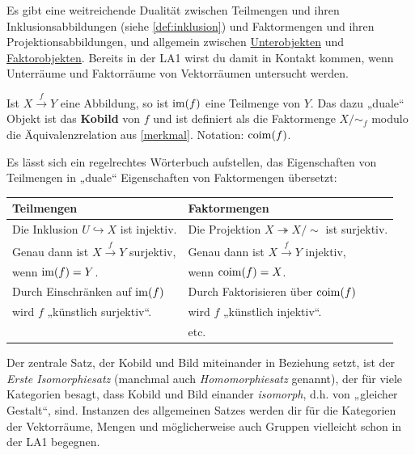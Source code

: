 \begin{vorschau} \label{teilmengenvsfaktormengen} 
    Es gibt eine weitreichende Dualität zwischen Teilmengen und ihren Inklusionsabbildungen (siehe \cref{def:inklusion}) und Faktormengen und ihren Projektionsabbildungen, und allgemein zwischen \href{https://ncatlab.org/nlab/show/subobject}{Unterobjekten} und \href{https://ncatlab.org/nlab/show/quotient+object}{Faktorobjekten}. Bereits in der LA1 wirst du damit in Kontakt kommen, wenn Unterräume und Faktorräume von Vektorräumen untersucht werden.
    
    Ist $X\xrightarrow{f} Y$ eine Abbildung, so ist $\operatorname{im}(f)$ eine Teilmenge von $Y$. Das dazu „duale“ Objekt ist das \textbf{Kobild} von $f$ und ist definiert als die Faktormenge $X/{\sim_f}$ modulo die Äquivalenzrelation aus \cref{merkmal}. Notation: $\operatorname{coim}(f)$.
    
    Es lässt sich ein regelrechtes Wörterbuch aufstellen, das Eigenschaften von Teilmengen in „duale“ Eigenschaften von Faktormengen übersetzt:
    \begin{center}
    \begin{tabular}{ll}
    Teilmengen & Faktormengen \\
    \midrule
    Die Inklusion $U\hookrightarrow X$ ist injektiv. & Die Projektion $X\twoheadrightarrow X/{\sim}$ ist surjektiv. \\
    Genau dann ist $X\xrightarrow{f} Y$ surjektiv,  & Genau dann ist $X\xrightarrow{f} Y$ injektiv, \\
    \quad wenn $\operatorname{im}(f)=Y$. & \quad wenn $\operatorname{coim}(f)=X$. \\
    Durch Einschränken auf $\operatorname{im}(f)$ & Durch Faktorisieren über $\operatorname{coim}(f)$ \\
    \quad wird $f$ „künstlich surjektiv“.\footnotemark & \quad wird $f$ „künstlich injektiv“. \\
     & \hfill etc. 
    \end{tabular}
    \end{center}
    
    \noindent Der zentrale Satz, der Kobild und Bild miteinander in Beziehung setzt, ist der \emph{Erste Isomorphiesatz} (manchmal auch \emph{Homomorphiesatz} genannt), der für viele Kategorien besagt, dass Kobild und Bild einander \emph{isomorph}, d.h. von „gleicher Gestalt“, sind. Instanzen des allgemeinen Satzes werden dir für die Kategorien der Vektorräume, Mengen und möglicherweise auch Gruppen vielleicht schon in der LA1 begegnen.
\end{vorschau}


